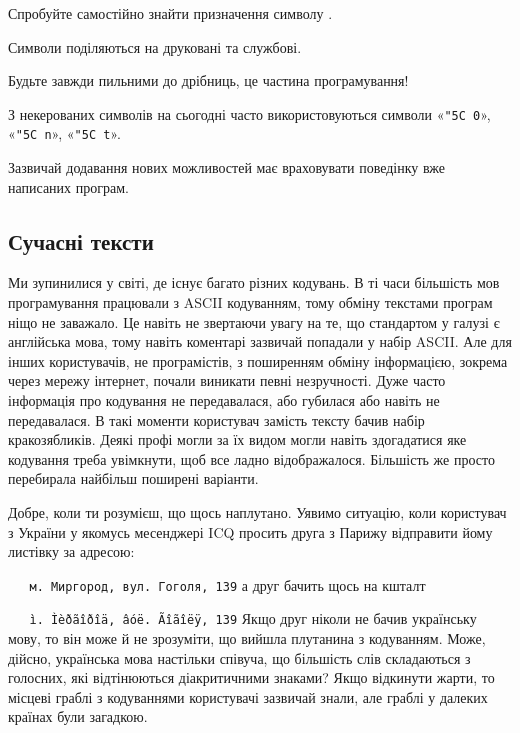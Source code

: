 \documentclass{book}
\newcommand{\escape}[1]{\texttt{\char"5C #1}}
\newcommand{\textseq}[1]{\par\vbox{\texttt{~~~}#1}}
\newcommand{\chr}[1]{«\texttt{#1}»}
\newcommand{\chesc}[1]{\chr{\escape{#1}}}
\begin{document}
\begin{exercise}
Спробуйте самостійно знайти призначення символу .
\end{exercise}

\begin{summary}
\item Символи поділяються на друковані та службові.
\item Будьте завжди пильними до дрібниць, це частина програмування!
\item З некерованих символів на сьогодні часто використовуються символи \chesc 0, \chesc n, \chesc t.
\item Зазвичай додавання нових можливостей має враховувати поведінку вже написаних програм.
\end{summary}

\subsection{Сучасні тексти}

Ми зупинилися у світі, де існує багато різних кодувань.
В ті часи більшість мов програмування працювали з ASCII кодуванням, тому обміну текстами програм ніщо не заважало.
Це навіть не звертаючи увагу на те, що стандартом у галузі є англійська мова, тому навіть коментарі зазвичай попадали у набір ASCII.
Але для інших користувачів, не програмістів, з поширенням обміну інформацією, зокрема через мережу інтернет, почали виникати певні незручності.
Дуже часто інформація про кодування не передавалася, або губилася або навіть не передавалася.
В такі моменти користувач замість тексту бачив набір кракозябликів.
Деякі профі могли за їх видом могли навіть здогадатися яке кодування треба увімкнути, щоб все ладно відображалося.
Більшість же просто перебирала найбільш поширені варіанти.

Добре, коли ти розумієш, що щось наплутано.
Уявимо ситуацію, коли користувач з України у якомусь месенджері ICQ просить друга з Парижу відправити йому листівку за адресою:
\textseq{\texttt{м. Миргород, вул. Гоголя, 139}}
\noindent а друг бачить щось на кшталт
\textseq{\texttt{ì. Ìèðãîðîä, âóë. Ãîãîëÿ, 139}}
\noindent Якщо друг ніколи не бачив українську мову, то він може й не зрозуміти, що вийшла плутанина з кодуванням.
Може, дійсно, українська мова настільки співуча, що більшість слів складаються з голосних, які відтінюються діакритичними знаками?
Якщо відкинути жарти, то місцеві граблі з кодуваннями користувачі зазвичай знали, але граблі у далеких країнах були загадкою.
\end{document}
